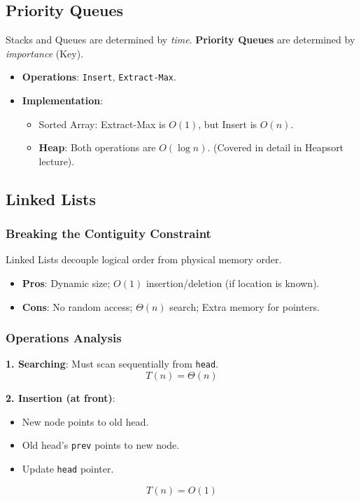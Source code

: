 \documentclass[12pt]{article}
\theoremstyle{blueplain}
\theoremstyle{bluedef}
\theoremstyle{blueremark}
\begin{document}
\subsection{Priority Queues}

Stacks and Queues are determined by \textit{time}. \textbf{Priority Queues} are determined by \textit{importance} (Key).
\begin{itemize}
    \item \textbf{Operations}: \texttt{Insert}, \texttt{Extract-Max}.
    \item \textbf{Implementation}:
          \begin{itemize}
              \item Sorted Array: Extract-Max is $O(1)$, but Insert is $O(n)$.
              \item \textbf{Heap}: Both operations are $O(\log n)$. (Covered in detail in Heapsort lecture).
          \end{itemize}
\end{itemize}

\subsection{Linked Lists}

\subsubsection{Breaking the Contiguity Constraint}
Linked Lists decouple logical order from physical memory order.
\begin{itemize}
    \item \textbf{Pros}: Dynamic size; $O(1)$ insertion/deletion (if location is known).
    \item \textbf{Cons}: No random access; $\Theta(n)$ search; Extra memory for pointers.
\end{itemize}

\subsubsection{Operations Analysis}

\textbf{1. Searching}:
Must scan sequentially from \texttt{head}.
\[ T(n) = \Theta(n) \]

\textbf{2. Insertion (at front)}:
\begin{itemize}
    \item New node points to old head.
    \item Old head's \texttt{prev} points to new node.
    \item Update \texttt{head} pointer.
\end{itemize}
\[ T(n) = O(1) \]
\end{document}

